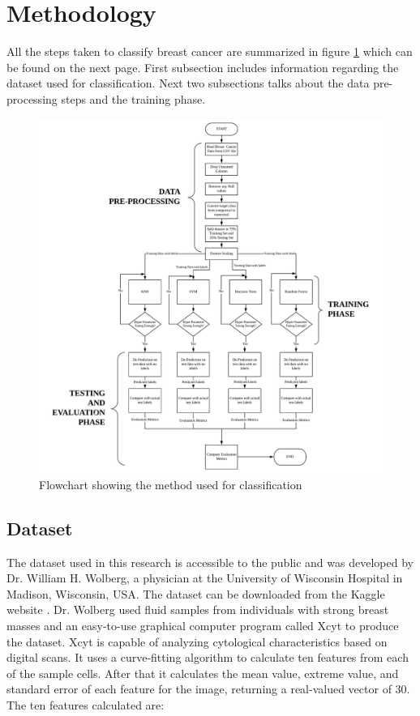 \documentclass[journal]{IEEEtran}
\begin{document}
\section{Methodology}

All the steps taken to classify breast cancer are summarized in figure \ref{Fig:mtd} which can be found on the next page. First subsection includes information regarding the dataset used for classification. Next two subsections talks about the data pre-processing steps and the training phase.

\begin{figure}[]
   \centering
   \includegraphics[scale = 0.73]{methodology.png}
   \caption{Flowchart showing the method used for classification}
   \label{Fig:mtd}
\end{figure}

\subsection{Dataset}
The dataset used in this research is accessible to the public and was developed by Dr. William H. Wolberg, a physician at the University of Wisconsin Hospital in Madison, Wisconsin, USA. The dataset can be downloaded from the Kaggle website \cite{uci_2016}. Dr. Wolberg used fluid samples from individuals with strong breast masses and an easy-to-use graphical computer program called Xcyt to produce the dataset. Xcyt is capable of analyzing cytological characteristics based on digital scans. It uses a curve-fitting algorithm to calculate ten features from each of the sample cells. After that it calculates the mean value, extreme value, and standard error of each feature for the image, returning a real-valued vector of 30. The ten features calculated are:
\end{document}
